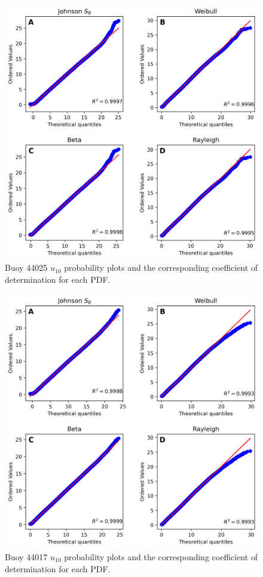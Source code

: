 \begin{figure}[H]
\centering
\includegraphics[width=0.68\linewidth]{Figures/Chapter5/b44025_wind_probplot.png}
\caption{Buoy 44025 $u_{10}$ probability plots and the corresponding coefficient of determination for each PDF.}
\label{fig:b44025_probplot}
\end{figure}


\begin{figure}[H]
\centering
\includegraphics[width=0.68\linewidth]{Figures/Chapter5/b44017_wind_probplot.png}
\caption{Buoy 44017 $u_{10}$ probability plots and the corresponding coefficient of determination for each PDF.}
\label{fig:b44017_probplot}
\end{figure}


